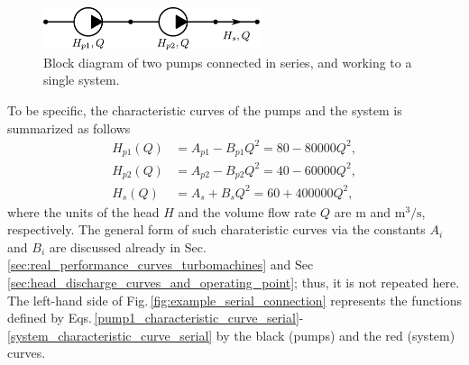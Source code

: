 \begin{figure}[ht!]
	\centering
		\includegraphics[height=1.25cm]{Control/Figures/Block_Diagram_Serial_Connection.pdf}
	\caption{Block diagram of two pumps connected in series, and working to a single system.}
	\label{fig:block_diagram_serial_connection}
\end{figure}

To be specific, the characteristic curves of the pumps and the system is summarized as follows
%
\begin{align}
H_{p1}(Q) &= A_{p1} - B_{p1} Q^2 = 80 -  80000 Q^2, \label{pump1_characteristic_curve_serial} \\
H_{p2}(Q) &= A_{p2} - B_{p2} Q^2 = 40 -  60000 Q^2, \label{pump2_characteristic_curve_serial} \\
H_s(Q)    &= A_s    + B_s    Q^2 = 60 + 400000 Q^2, \label{system_characteristic_curve_serial}
\end{align}
%
where the units of the head $H$ and the volume flow rate $Q$ are $\mathrm{m}$ and $\mathrm{m^3/s}$, respectively. The general form of such charateristic curves via the constants $A_i$ and $B_i$ are discussed already in Sec.\,\ref{sec:real_performance_curves_turbomachines} and Sec\,\ref{sec:head_discharge_curves_and_operating_point}; thus, it is not repeated here. The left-hand side of Fig.\,\ref{fig:example_serial_connection} represents the functions defined by Eqs.\,\eqref{pump1_characteristic_curve_serial}-\eqref{system_characteristic_curve_serial} by the black (pumps) and the red (system) curves.

